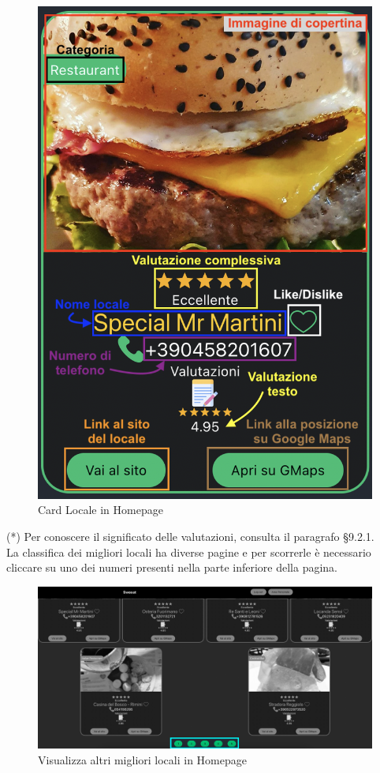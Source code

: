 \begin{figure}[H]
\centering
\includegraphics[scale=0.4]{./images/Homepage/Card.png} 
\caption{Card Locale in Homepage}
\end{figure}

(*) Per conoscere il significato delle valutazioni, consulta il paragrafo \S{9.2.1}. \\

La classifica dei migliori locali ha diverse pagine e per scorrerle è necessario cliccare su uno dei numeri presenti nella parte inferiore della pagina.

\begin{figure}[H]
\centering
\includegraphics[scale=0.15]{./images/Homepage/Pagine.png} 
\caption{Visualizza altri migliori locali in Homepage}
\end{figure}

